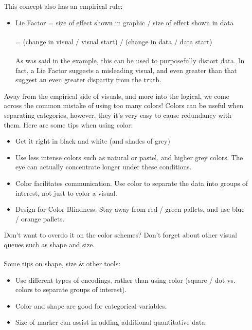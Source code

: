This concept also has an empirical rule:

\begin{itemize}
	\item Lie Factor = size of effect shown in graphic / size of effect shown in data
	\\\\
	= (change in visual / visual start) / (change in data / data start)
	\\\\
	As was said in the example, this can be used to purposefully distort data. In fact, a Lie Factor  suggests a misleading visual, and even greater than that suggest an even greater disparity from the truth.
\end{itemize}

Away from the empirical side of visuals, and more into the logical, we come across the common mistake of using too many colors! Colors can be useful when separating categories, however, they it's very easy to cause redundancy with them. Here are some tips when using color:

\begin{itemize}
	\item Get it right in black and white (and shades of grey)
	\item Use less intense colors such as natural or pastel, and higher grey colors. The eye can actually concentrate longer under these conditions.
	\item Color facilitates communication. Use color to separate the data into groups of interest, not just to color a visual.
	\item Design for Color Blindness. Stay away from red / green pallets, and use blue / orange pallets.
\end{itemize}

Don't want to overdo it on the color schemes? Don't forget about other visual queues such as shape and size.
\\\\

Some tips on shape, size \& other tools:
\begin{itemize}
	\item Use different types of encodings, rather than using color (square / dot vs. colors to separate groups of interest).
	\item Color and shape are good for categorical variables.
	\item Size of marker can assist in adding additional quantitative data.
\end{itemize}